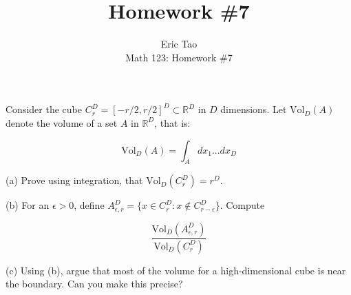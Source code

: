 \documentclass[10pt]{article}
\newcommand{\vol}{{\text{Vol}}}
\newenvironment{problem}[2][]{\begin{trivlist}
\item[\hskip \labelsep {\bfseries #1}\hskip \labelsep {\bfseries #2.}]}{\end{trivlist}}
\begin{document}
 
\title{Homework \#7}
\author{Eric Tao\\
Math 123: Homework \#7}
\maketitle

\begin{problem}{Question 1}

Consider the cube $C_r^D = [-r/2, r/2]^D \subset \mathbb{R}^D$ in $D$ dimensions. Let $\vol_D(A)$ denote the volume of a set $A$ in $\mathbb{R}^D$, that is:

$$ \vol_D(A) = \int_A dx_1...dx_D$$

(a) Prove using integration, that $\vol_D(C_r^D) = r^D$.

(b) For an $\epsilon > 0$, define $A_{\epsilon,r}^D = \{ x \in C_r^D : x \not \in C_{r - \epsilon}^D \}$. Compute

$$ \frac{\vol_D(A_{\epsilon, r}^D)}{\vol_D( C_r^D)}$$

(c) Using (b), argue that most of the volume for a high-dimensional cube is near the boundary. Can you make this precise?

\end{problem}
\end{document}
